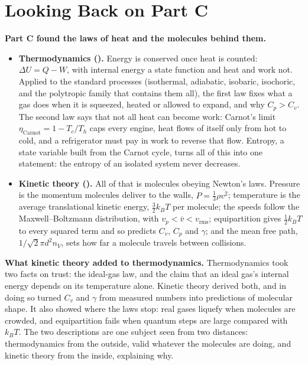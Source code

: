 \section*{Looking Back on Part C}

\textbf{Part C found the laws of heat and the molecules behind them.}
\begin{itemize}
\item \textbf{Thermodynamics ().} Energy is conserved once heat is counted:
$\Delta U=Q-W$, with internal energy a state function and heat and work not. Applied to the standard
processes (isothermal, adiabatic, isobaric, isochoric, and the polytropic family that contains them all),
the first law fixes what a gas does when it is squeezed, heated or allowed to expand, and why $C_p>C_v$.
The second law says that not all heat can become work: Carnot's limit $\eta_{\text{Carnot}}=1-T_c/T_h$ caps every
engine, heat flows of itself only from hot to cold, and a refrigerator must pay in work to reverse that flow. Entropy, a state variable built from the Carnot cycle, turns all of this into one statement: the entropy of an isolated system never decreases.
\item \textbf{Kinetic theory ().} All of that is molecules obeying Newton's laws.
Pressure is the momentum molecules deliver to the walls, $P=\tfrac13\rho\overline{v^2}$; temperature is
the average translational kinetic energy, $\tfrac32k_BT$ per molecule; the speeds follow the
Maxwell--Boltzmann distribution, with $v_p<\bar v<v_{\text{rms}}$; equipartition gives $\tfrac12k_BT$ to
every squared term and so predicts $C_v$, $C_p$ and $\gamma$; and the mean free path,
$1/\sqrt2\pi d^2n_V$, sets how far a molecule travels between collisions.
\end{itemize}
\textbf{What kinetic theory added to thermodynamics.} Thermodynamics took two facts on trust: the
ideal-gas law, and the claim that an ideal gas's internal energy depends on its temperature alone. Kinetic
theory derived both, and in doing so turned $C_v$ and $\gamma$ from measured numbers into predictions of
molecular shape. It also showed where the laws stop: real gases liquefy when molecules are crowded, and
equipartition fails when quantum steps are large compared with $k_BT$. The two descriptions are one
subject seen from two distances: thermodynamics from the outside, valid whatever the molecules are doing,
and kinetic theory from the inside, explaining why.

